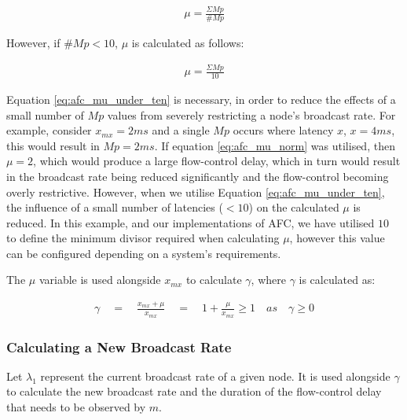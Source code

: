     \begin{equation}\label{eq:afc_mu_norm}
		     \begin{aligned}
		         \mu = \frac{\Sigma Mp}{\#Mp}
		     \end{aligned}
    \end{equation}
    
    However, if $\#Mp < 10$, $\mu$ is calculated as follows:
    
    \begin{equation}\label{eq:afc_mu_under_ten}
		     \begin{aligned}
		         \mu = \frac{\Sigma Mp}{10}
		     \end{aligned}
    \end{equation}
    
   Equation \ref{eq:afc_mu_under_ten} is necessary, in order to reduce the effects of a small number of $Mp$ values from severely restricting a node's broadcast rate.  For example, consider  $x_{mx} = 2ms$ and a single $Mp$ occurs where latency $x$, $x = 4ms$, this would result in $Mp = 2ms$.  If equation \ref{eq:afc_mu_norm} was utilised, then $\mu = 2$, which would produce a large flow-control delay, which in turn would result in the broadcast rate being reduced significantly and the flow-control becoming overly restrictive.  However, when we utilise Equation \ref{eq:afc_mu_under_ten}, the influence of a small number of latencies ($< 10$) on the calculated $\mu$ is reduced.  In this example, and our implementations of AFC, we have utilised $10$ to define the minimum divisor required when calculating $\mu$, however this value can be configured depending on a system's requirements.  
    
    The $\mu$ variable is used alongside $x_{mx}$ to calculate $\gamma$, where $\gamma$ is calculated as:
    
    \begin{equation}\label{eq:afc_gamma}
		     \begin{aligned}
		         \gamma \quad = \quad \frac{x_{mx} + \mu}{x_{mx}} \quad = \quad 1 + \frac{\mu}{x_{mx}} \geq 1 \quad as \quad \gamma \geq 0
		     \end{aligned}
    \end{equation} 
    
    \subsubsection*{Calculating a New Broadcast Rate}
    Let $\lambda_1$ represent the current broadcast rate of a given node.  It is used alongside $\gamma$ to calculate the new broadcast rate and the duration of the flow-control delay that needs to be observed by $m$.  
    
